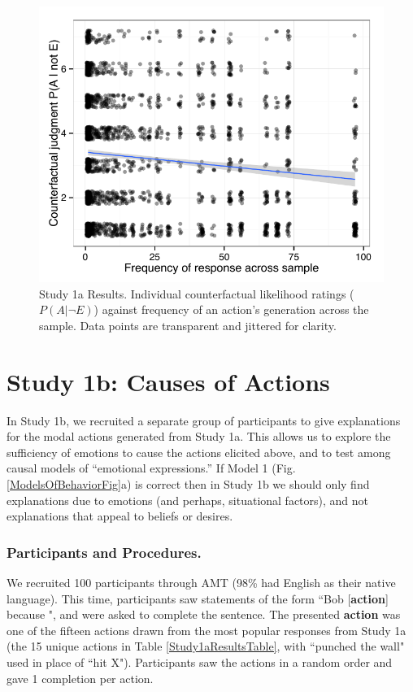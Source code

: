 \documentclass[10pt,letterpaper]{article}
\begin{document}
\begin{figure}[htb!]
\begin{center}
	\includegraphics[width=0.85\columnwidth]{images/study1a_results.pdf}
\end{center}
\caption{ Study 1a Results. Individual counterfactual likelihood ratings ($P(A | \neg E)$) against frequency of an action's generation across the sample. Data points are transparent and jittered for clarity. }
\label{Study1aResultsFig}
\end{figure}


\section{Study 1b: Causes of Actions}

In Study 1b, we recruited a separate group of participants to give explanations for the modal actions generated from Study 1a. 
This allows us to explore the sufficiency of emotions to cause the actions elicited above, and to test among causal models of ``emotional expressions.''
If Model 1 (Fig. \ref{ModelsOfBehaviorFig}a) is correct then in Study 1b we should only find explanations due to emotions (and perhaps, situational factors), and not explanations that appeal to beliefs or desires.


\subsubsection{Participants and Procedures.} 
We recruited 100 participants through AMT (98\% had English as their native language). This time, participants saw statements of the form ``Bob [\textbf{action}] because \underline{\hspace{2em}}", and were asked to complete the sentence. The presented \textbf{action} was one of the fifteen actions drawn from the most popular responses from Study 1a (the 15 unique actions in Table \ref{Study1aResultsTable}, with ``punched the wall" used in place of ``hit X"). Participants saw the actions in a random order and gave 1 completion per action.
\end{document}
